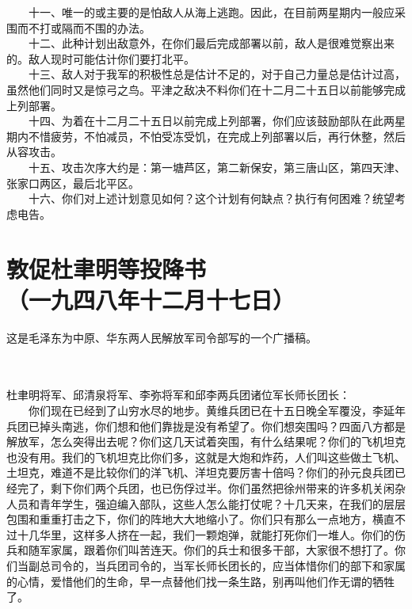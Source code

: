 \documentclass[cn,11pt,chinese]{elegantbook}
\def\myformat#1{\hfil\hfil #1}
\begin{document}
　　十一、唯一的或主要的是怕敌人从海上逃跑。因此，在目前两星期内一般应采围而不打或隔而不围的办法。\\
　　十二、此种计划出敌意外，在你们最后完成部署以前，敌人是很难觉察出来的。敌人现时可能估计你们要打北平。\\
　　十三、敌人对于我军的积极性总是估计不足的，对于自己力量总是估计过高，虽然他们同时又是惊弓之鸟。平津之敌决不料你们在十二月二十五日以前能够完成上列部署。\\
　　十四、为着在十二月二十五日以前完成上列部署，你们应该鼓励部队在此两星期内不惜疲劳，不怕减员，不怕受冻受饥，在完成上列部署以后，再行休整，然后从容攻击。\\
　　十五、攻击次序大约是：第一塘芦区，第二新保安，第三唐山区，第四天津、张家口两区，最后北平区。\\
　　十六、你们对上述计划意见如何？这个计划有何缺点？执行有何困难？统望考虑电告。\\
\newpage\section*{\myformat{敦促杜聿明等投降书}\\\myformat{（一九四八年十二月十七日）}}
\begin{introduction}\item  这是毛泽东为中原、华东两人民解放军司令部写的一个广播稿。\end{introduction}\\~\\
杜聿明将军、邱清泉将军、李弥将军和邱李两兵团诸位军长师长团长：\\
　　你们现在已经到了山穷水尽的地步。黄维兵团已在十五日晚全军覆没，李延年兵团已掉头南逃，你们想和他们靠拢是没有希望了。你们想突围吗？四面八方都是解放军，怎么突得出去呢？你们这几天试着突围，有什么结果呢？你们的飞机坦克也没有用。我们的飞机坦克比你们多，这就是大炮和炸药，人们叫这些做土飞机、土坦克，难道不是比较你们的洋飞机、洋坦克要厉害十倍吗？你们的孙元良兵团已经完了，剩下你们两个兵团，也已伤俘过半。你们虽然把徐州带来的许多机关闲杂人员和青年学生，强迫编入部队，这些人怎么能打仗呢？十几天来，在我们的层层包围和重重打击之下，你们的阵地大大地缩小了。你们只有那么一点地方，横直不过十几华里，这样多人挤在一起，我们一颗炮弹，就能打死你们一堆人。你们的伤兵和随军家属，跟着你们叫苦连天。你们的兵士和很多干部，大家很不想打了。你们当副总司令的，当兵团司令的，当军长师长团长的，应当体惜你们的部下和家属的心情，爱惜他们的生命，早一点替他们找一条生路，别再叫他们作无谓的牺牲了。\\
\end{document}
